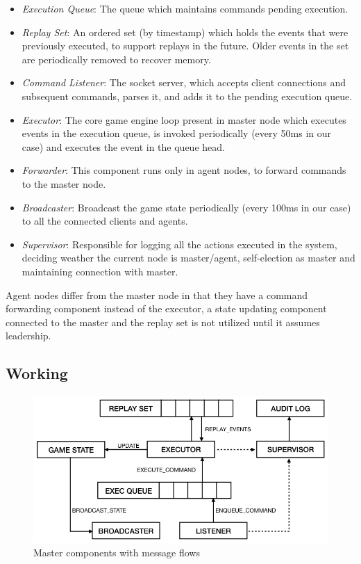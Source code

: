 \documentclass[a4paper]{IEEEtran}
\begin{document}
  \begin{itemize}
    \item \emph{Execution Queue}: The queue which maintains commands pending execution.
    \item \emph{Replay Set}: An ordered set (by timestamp) which holds the events that were previously executed, to support replays in the future. Older events in the set are periodically removed to recover memory. 
    \item \emph{Command Listener}: The socket server, which accepts client connections and subsequent commands, parses it, and adds it to the pending execution queue.
    \item \emph{Executor}: The core game engine loop present in master node which executes events in the execution queue, is invoked periodically (every 50ms in our case) and executes the event in the queue head.
    \item \emph{Forwarder}: This component runs only in agent nodes, to forward commands to the master node.
    \item \emph{Broadcaster}: Broadcast the game state periodically (every 100ms in our case) to all the connected clients and agents. 
    \item \emph{Supervisor}: Responsible for logging all the actions executed in the system, deciding weather the current node is master/agent, self-election as master and maintaining connection with master.
  \end{itemize}

  Agent nodes differ from the master node in that they have a command forwarding component instead of the executor, a state updating component connected to the master and the replay set is not utilized until it assumes leadership.
  
  \subsection{Working}
   
  \begin{figure}[bp]
    \centering
      \includegraphics[width=\columnwidth]{master_components.png}
    \caption{Master components with message flows}
    \label{fig:master_components}
  \end{figure}
  
\end{document}

